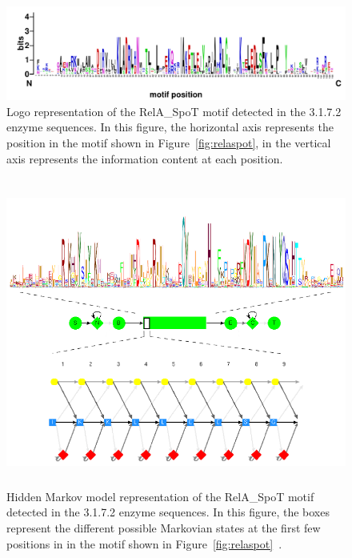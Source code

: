     \begin{figure}[ptb]
        \centering
        \includegraphics[width=\textwidth]{Body/Images-chap3/spot-logo.pdf}
        \caption[Logo representation of the RelA\_SpoT motif detected in the 3.1.7.2 enzyme sequences]{Logo representation of the RelA\_SpoT motif detected in the 3.1.7.2 enzyme sequences.
            In this figure, the horizontal axis represents the
            position in the motif shown in
            Figure~\vref{fig:relaspot}, in the vertical axis
            represents the information content at each position.
        }\label{fig:relaspotlogo}
    \end{figure}

    \begin{figure}
        \centering
        \includegraphics[height=4in]{Body/Images-chap3/hmm-graph.png}
        \caption[Logo representation of the RelA\_SpoT motif detected in the 3.1.7.2 enzyme sequences]{%
            Hidden Markov model representation of the RelA\_SpoT motif detected in the 3.1.7.2 enzyme sequences.
            In this figure, the boxes represent the different
            possible Markovian states at the first few positions in
            in the motif shown in
            Figure~\vref{fig:relaspot}~\cite{schuster2004hmm}.
        }\label{fig:relaspotlogohmmer}
    \end{figure}

